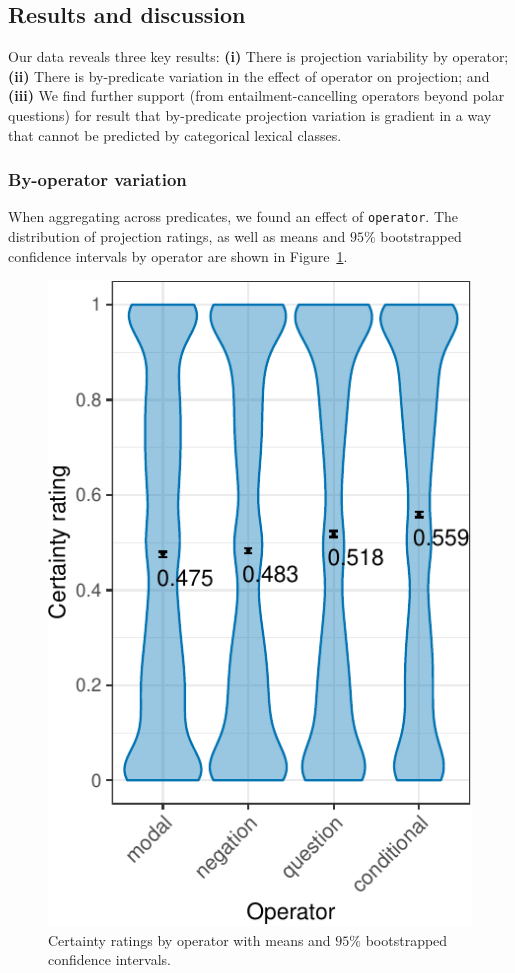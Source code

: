 \documentclass[a4paper,12pt,twoside]{article}
\begin{document}
	\subsection{Results and discussion}
		Our data reveals three key results: \textbf{(i)} There is projection variability by operator; \textbf{(ii)} There is by-predicate variation in the effect of operator on projection; and \textbf{(iii)} We find further support (from entailment-cancelling operators beyond polar questions) for  result that by-predicate projection variation is gradient in a way that cannot be predicted by categorical lexical classes.
		
		\subsubsection{By-operator variation}
			When aggregating across predicates, we found an effect of \texttt{operator}. The distribution of projection ratings, as well as means and $95\%$ bootstrapped confidence intervals by operator are shown in Figure~\ref{fig:op-ratings}.

			\begin{figure}[ht]
				\centering
				\includegraphics[scale = .8]{operator-graph-1}
				\caption{Certainty ratings by operator with means and $95\%$ bootstrapped confidence intervals.}
				\label{fig:op-ratings}
			\end{figure}
\end{document}

